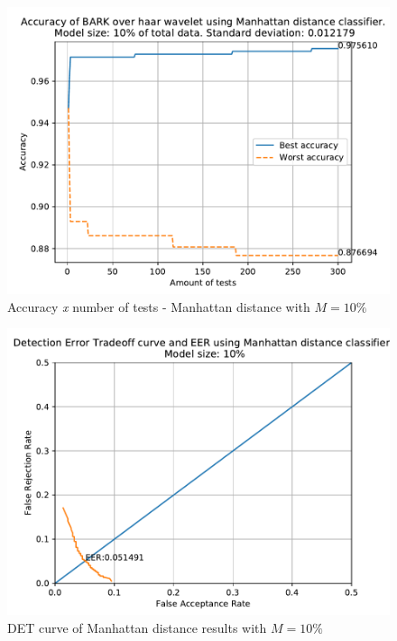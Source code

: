 		\begin{figure}[H]
			\centering
			\includegraphics[scale=.8]{images/results/confusionMatrices/classifier_Manhattan_10.pdf}
			\caption{Accuracy \textit{x} number of tests - Manhattan distance with $M=10\%$}
			\label{fig:classifiermanhattan10}
		\end{figure}
		\begin{figure}[H]
			\centering
			\includegraphics[scale=.8]{images/results/det/DET_for_classifier_Manhattan_10}
			\caption{DET curve of Manhattan distance results with $M=10\%$}
			\label{fig:detforclassifiermanhattan10}
		\end{figure}
